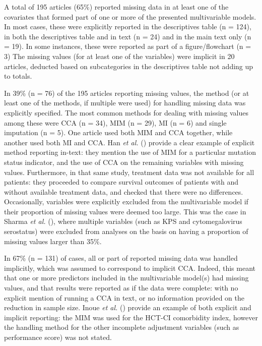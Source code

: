 \documentclass[
  letterpaper,
  paper=240mm:170mm,
  twoside=true,
  open=right,
  fontsize=10pt,
  pagesize=false,
  BCOR=15mm,
  DIV=14,
  headinclude=true,
  footinclude=false,
  headsepline=on]{scrbook}
\begin{document}
A total of 195 articles (65\%) reported missing data in at least one of
the covariates that formed part of one or more of the presented
multivariable models. In most cases, these were explicitly reported in
the descriptives table (n = 124), in both the descriptives table and in
text (n = 24) and in the main text only (n = 19). In some instances,
these were reported as part of a figure/flowchart (n = 3) The missing
values (for at least one of the variables) were implicit in 20 articles,
deducted based on subcategories in the descriptives table not adding up
to totals.

In 39\% (n = 76) of the 195 articles reporting missing values, the
method (or at least one of the methods, if multiple were used) for
handling missing data was explicitly specified. The most common methods
for dealing with missing values among these were CCA (n = 34), MIM (n =
29), MI (n = 6) and single imputation (n = 5). One article used both MIM
and CCA together, while another used both MI and CCA. Han \emph{et al.}
() provide
a clear example of explicit method reporting in-text: they mention the
use of MIM for a particular mutation status indicator, and the use of
CCA on the remaining variables with missing values. Furthermore, in that
same study, treatment data was not available for all patients: they
proceeded to compare survival outcomes of patients with and without
available treatment data, and checked that there were no differences.
Occasionally, variables were explicitly excluded from the multivariable
model if their proportion of missing values were deemed too large. This
was the case in Sharma \emph{et al.}
(), where
multiple variables (such as KPS and cytomegalovirus serostatus) were
excluded from analyses on the basis on having a proportion of missing
values larger than 35\%.

In 67\% (n = 131) of cases, all or part of reported missing data was
handled implicitly, which was assumed to correspond to implicit CCA.
Indeed, this meant that one or more predictors included in the
multivariable model(s) had missing values, and that results were
reported as if the data were complete: with no explicit mention of
running a CCA in text, or no information provided on the reduction in
sample size. Inoue \emph{et al.}
() provide an
example of both explicit and implicit reporting: the MIM was used for
the HCT-CI comorbidity index, however the handling method for the other
incomplete adjustment variables (such as performance score) was not
stated.
\end{document}
